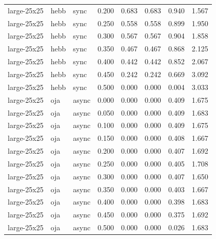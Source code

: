 \begin{tabular}{lllrrrrr}
large-25x25 & hebb & sync & 0.200 & 0.683 & 0.683 & 0.940 & 1.567 \\

large-25x25 & hebb & sync & 0.250 & 0.558 & 0.558 & 0.899 & 1.950 \\

large-25x25 & hebb & sync & 0.300 & 0.567 & 0.567 & 0.904 & 1.858 \\

large-25x25 & hebb & sync & 0.350 & 0.467 & 0.467 & 0.868 & 2.125 \\

large-25x25 & hebb & sync & 0.400 & 0.442 & 0.442 & 0.852 & 2.067 \\

large-25x25 & hebb & sync & 0.450 & 0.242 & 0.242 & 0.669 & 3.092 \\

large-25x25 & hebb & sync & 0.500 & 0.000 & 0.000 & 0.004 & 3.033 \\

large-25x25 & oja & async & 0.000 & 0.000 & 0.000 & 0.409 & 1.675 \\

large-25x25 & oja & async & 0.050 & 0.000 & 0.000 & 0.409 & 1.683 \\

large-25x25 & oja & async & 0.100 & 0.000 & 0.000 & 0.409 & 1.675 \\

large-25x25 & oja & async & 0.150 & 0.000 & 0.000 & 0.408 & 1.667 \\

large-25x25 & oja & async & 0.200 & 0.000 & 0.000 & 0.407 & 1.692 \\

large-25x25 & oja & async & 0.250 & 0.000 & 0.000 & 0.405 & 1.708 \\

large-25x25 & oja & async & 0.300 & 0.000 & 0.000 & 0.407 & 1.650 \\

large-25x25 & oja & async & 0.350 & 0.000 & 0.000 & 0.403 & 1.667 \\

large-25x25 & oja & async & 0.400 & 0.000 & 0.000 & 0.398 & 1.683 \\

large-25x25 & oja & async & 0.450 & 0.000 & 0.000 & 0.375 & 1.692 \\

large-25x25 & oja & async & 0.500 & 0.000 & 0.000 & 0.026 & 1.683 \\


\end{tabular}
